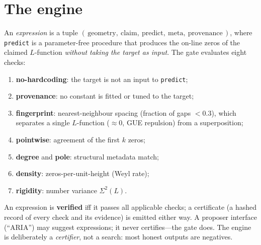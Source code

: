 \documentclass[11pt]{article}
\theoremstyle{definition}
\begin{document}
\section{The engine}
An \emph{expression} is a tuple $(\,\text{geometry},\ \text{claim},\
\text{predict},\ \text{meta},\ \text{provenance}\,)$, where \texttt{predict} is a
parameter-free procedure that produces the on-line zeros of the claimed $L$-function
\emph{without taking the target as input}. The gate evaluates eight checks:
\begin{enumerate}\itemsep1pt
\item \textbf{no-hardcoding}: the target is not an input to \texttt{predict};
\item \textbf{provenance}: no constant is fitted or tuned to the target;
\item \textbf{fingerprint}: nearest-neighbour spacing (fraction of gaps $<0.3$),
which separates a single $L$-function ($\approx 0$, GUE repulsion) from a
superposition;
\item \textbf{pointwise}: agreement of the first $k$ zeros;
\item \textbf{degree} and \textbf{pole}: structural metadata match;
\item \textbf{density}: zeros-per-unit-height (Weyl rate);
\item \textbf{rigidity}: number variance $\Sigma^2(L)$.
\end{enumerate}
An expression is \textbf{verified} iff it passes all applicable checks; a
certificate (a hashed record of every check and its evidence) is emitted either way.
A proposer interface (``ARIA'') may suggest expressions; it never certifies---the
gate does. The engine is deliberately a \emph{certifier}, not a search: most honest
outputs are negatives.
\end{document}
